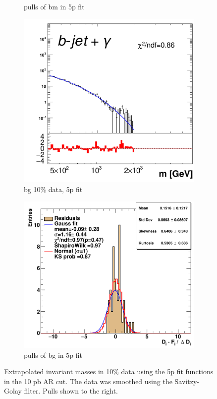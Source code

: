 \begin{figure}[H]
\begin{subfigure}[h]{0.4\linewidth}
    \caption{pulls of bm in 5p fit}
    \end{subfigure}
    \hfill
    \begin{subfigure}[h]{0.38\linewidth}
    \includegraphics[scale=0.3]{figs//app/10data/pub_mass_10per_extrapolate_bg.pdf}%
    \caption{bg 10\% data, 5p fit}
    \end{subfigure}
    \hfill
    \begin{subfigure}[h]{0.4\linewidth}
    \includegraphics[scale=0.32]{figs/app/10data/pub_mass_10per_extrapolate_residuals_bg.pdf}%
    \caption{pulls of bg in 5p fit}
    \end{subfigure}
    \hfill
    \caption{Extrapolated invariant masses in 10\% data using the 5p fit functions in the 10 pb AR cut. The data was smoothed using the Savitzy-Golay filter. Pulls shown to the right.}
\label{fig:10data-fit-pulls-be}
\end{figure}
